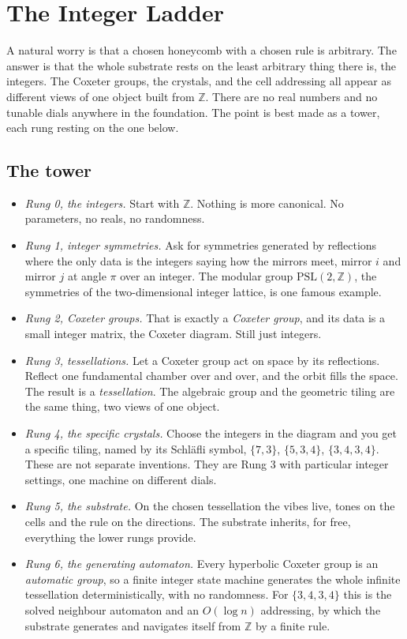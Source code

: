 \section{The Integer Ladder}

A natural worry is that a chosen honeycomb with a chosen rule is arbitrary. The answer is that the whole substrate
rests on the least arbitrary thing there is, the integers. The Coxeter groups, the crystals, and the cell
addressing all appear as different views of one object built from $\mathbb{Z}$. There are no real numbers and no
tunable dials anywhere in the foundation. The point is best made as a tower, each rung resting on the one below.

\subsection{The tower}

\begin{itemize}
\item \emph{Rung 0, the integers.} Start with $\mathbb{Z}$. Nothing is more canonical. No parameters, no reals,
no randomness.
\item \emph{Rung 1, integer symmetries.} Ask for symmetries generated by reflections where the only data is the
integers saying how the mirrors meet, mirror $i$ and mirror $j$ at angle $\pi$ over an integer. The modular group
$\mathrm{PSL}(2, \mathbb{Z})$, the symmetries of the two-dimensional integer lattice, is one famous example.
\item \emph{Rung 2, Coxeter groups.} That is exactly a \emph{Coxeter group}, and its data is a small integer
matrix, the Coxeter diagram. Still just integers.
\item \emph{Rung 3, tessellations.} Let a Coxeter group act on space by its reflections. Reflect one fundamental
chamber over and over, and the orbit fills the space. The result is a \emph{tessellation}. The algebraic group
and the geometric tiling are the same thing, two views of one object.
\item \emph{Rung 4, the specific crystals.} Choose the integers in the diagram and you get a specific tiling, named
by its Schl\"afli symbol, $\{7,3\}$, $\{5,3,4\}$, $\{3,4,3,4\}$. These are not separate inventions. They are
Rung 3 with particular integer settings, one machine on different dials.
\item \emph{Rung 5, the substrate.} On the chosen tessellation the vibes live, tones on the cells and the rule on
the directions. The substrate inherits, for free, everything the lower rungs provide.
\item \emph{Rung 6, the generating automaton.} Every hyperbolic Coxeter group is an \emph{automatic group}, so a
finite integer state machine generates the whole infinite tessellation deterministically, with no randomness. For
$\{3,4,3,4\}$ this is the solved neighbour automaton and an $O(\log n)$ addressing, by which the substrate
generates and navigates itself from $\mathbb{Z}$ by a finite rule.
\end{itemize}

